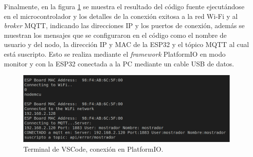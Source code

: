 Finalmente, en la figura \ref{fig:platformio-connect} se muestra el resultado del código fuente ejecutándose en el microcontrolador y los detalles de la conexión exitosa a la red Wi-Fi y al \textit{broker} MQTT, indicando las direcciones IP y los puertos de conexión, además se muestran los mensajes que se configuraron en el código como el nombre de usuario y del nodo, la dirección IP y MAC de la ESP32 y el tópico MQTT al cual está suscripto. Esto se realiza mediante el \textit{framework} PlatformIO en modo monitor y con la ESP32 conectada a la PC mediante un cable USB de datos.
 
\begin{figure}[H]
	\centering
	\includegraphics[width=\textwidth]{./Figures/platformio-connect.png}
	\caption{Terminal de VSCode, conexión en PlatformIO.}
	\label{fig:platformio-connect}
\end{figure}












	
		

		
		
		
		



